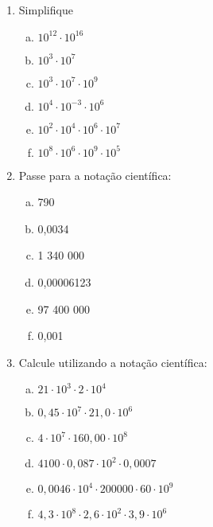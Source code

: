 \documentclass[a4paper,14pt]{article}
\begin{document}
\begin{multicols}{2}
\begin{enumerate}
\begin{enumerate}[a)]
			\end{enumerate}
			\item Simplifique
			\begin{enumerate}[a)]
				\item $10^{12} \cdot 10^{16}$
				\item $10^3 \cdot 10^7$
				\item $10^3 \cdot 10^7 \cdot 10^9$
				\item $10^4 \cdot 10^{-3} \cdot 10^6$ 
				\item $10^2 \cdot 10^4 \cdot 10^6 \cdot 10^7$
				\item $10^8 \cdot 10^6 \cdot 10^9 \cdot 10^5$
			\end{enumerate}
			\item Passe para a notação científica:
			\begin{enumerate}[a)]
				\item 790
				\item 0,0034
				\item 1 340 000
				\item 0,00006123
				\item 97 400 000
				\item 0,001
			\end{enumerate}
			\item Calcule utilizando a notação científica:
			\begin{enumerate}[a)]
				\item $21 \cdot 10^3 \cdot 2 \cdot 10^4$
				\item $0,45 \cdot 10^7 \cdot 21,0 \cdot 10^6$
				\item $4 \cdot 10^7 \cdot 160,00 \cdot 10^8$
				\item $4 100 \cdot 0,087 \cdot 10^2 \cdot 0,0007$ 
				\item $0,0046 \cdot 10^4 \cdot 200 000 \cdot 60 \cdot 10^9$
				\item $4,3 \cdot 10^8 \cdot 2,6 \cdot 10^2 \cdot 3,9 \cdot 10^6$
			\end{enumerate}
		\end{enumerate}

\end{multicols}
\end{document}
